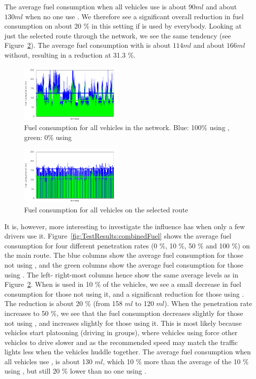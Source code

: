 The average fuel consumption when all vehicles use \tech is about $90 ml$ and about $130 ml$ when no one use \tech.
We therefore see a significant overall reduction in fuel consumption on about 20 \% in this setting if \tech is used by everybody.
Looking at just the selected route through the network, we see the same tendency (see Figure~\ref{fig:TestResults:fuelRoute}). 
The average fuel consumption with \tech is about $114 ml$ and about $166 ml$ without, resulting in a reduction at 31.3 \%.
\begin{figure}[htb]
\includegraphics[width=0.45\textwidth]{../images/tp0c0_8/fuelTotal.png}
\caption{Fuel consumption for all vehicles in the network. Blue: 100\% using \tech, green: 0\% using \tech}
\label{fig:TestResults:fuelTotal}
\end{figure}

\begin{figure}[htb]
\includegraphics[width=0.45\textwidth]{../images/tp0c0_8/fuelRoute.png}
\caption{Fuel consumption for all vehicles on the selected route}
\label{fig:TestResults:fuelRoute}
\end{figure}

It is, however, more interesting to investigate the influence \tech has when only a few drivers use it.
Figure~\ref{fig:TestResults:combinedFuel} shows the average fuel consumption for four different penetration rates (0 \%, 10 \%, 50 \% and 100 \%) on the main route.
The blue columns show the average fuel consumption for those not using \tech, and the green columns show the average fuel consumption for those using \tech.
The left- right-most columns hence show the same average levels as in Figure~\ref{fig:TestResults:fuelRoute}.
When \tech is used in 10 \% of the vehicles, we see a small decrease in fuel consumption for those not using it, and a significant reduction for those using \tech.
The reduction is about 20 \% (from 158 $ml$ to 120 $ml$).
When the penetration rate increases to 50 \%, we see that the fuel consumption decreases slightly for those not using \tech, and increases slightly for those using it.
This is most likely because vehicles start platooning (driving in groups), where vehicles using \tech force other vehicles to drive slower and as the recommended speed may match the traffic lights less when the vehicles huddle together.
The average fuel consumption when all vehicles use \tech, is about 130 $ml$, which 10 \% more than the average of the 10 \% using \tech, but still 20 \% lower than no one using \tech.

